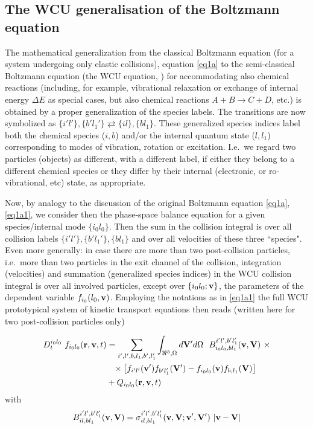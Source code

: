 \subsection{The \acs{WCU} generalisation of the Boltzmann equation}
\label{sec1.01} 

The mathematical generalization from the classical Boltzmann equation (for a
system undergoing only elastic collisions), equation \cref{eq1a} to the
semi-classical Boltzmann equation (the \ac{WCU} equation, \cite{kn:WCU}) for
accommodating also chemical reactions (including, for example, vibrational
relaxation or exchange of internal energy $\Delta E$ as special cases, but also
chemical reactions $A+B \rightarrow C+D$, etc.) is obtained by a proper
generalization of the species labels.
The transitions are now symbolized as $\{i'l'\},\{b'l_1'\} \rightleftarrows
  \{il\},\{bl_1\}$.
These generalized species indices label both the chemical species ($i,b$)
and/or the internal quantum state ($l,l_1$) corresponding to modes of
vibration, rotation or excitation.
I.e.\ we regard two particles (objects) as different, with a different label,
if either they belong to a different chemical species or they differ by their
internal (electronic, or ro-vibrational, etc) state, as appropriate.

Now, by analogy to the discussion of the original Boltzmann equation
\cref{eq1a}, \cref{eq1a1}, we consider then the phase-space balance equation
for a given species/internal mode $\{i_0l_0\}$.
Then the sum in the collision integral is over all collision labels $\{i'l'\},
  \{b'l_1'\}, \{bl_{1}\}$ and over all velocities of these three ``species".
Even more generally:
in case there are more than two post-collision particles, i.e.\ more than two
particles in the exit channel of the collision, integration (velocities) and
summation (generalized species indices) in the \ac{WCU} collision integral is
over all involved particles, except over $\{i_0l_0; \mathbf{v}\}
$, the parameters of the dependent variable $f_{i_0}(l_0,\mathbf{v})$.
Employing the notations as in \cref{eq1a1} the full \ac{WCU} prototypical
system of kinetic transport equations then reads (written here for two
post-collision particles only) 

\begin{align}
  \label{WCU} D_t^{i_0l_0} \ f_{i_0l_0}(\vr,\vvv,t) & =
  \sum_{i',l',b,l_1,b',l_1'}\int_{\Re^3,\Omega}  d\vV'd\Omega \ \
  B_{i_0l_0,bl_1}^{i'l',b'l_1'}(\vvv,\vV) \ \times                       \\
                                                   & \phantom{=} \times
  \left[f_{i'l'}
    (\vvv') f_{b'l_1'}(\vV')- f_{i_0l_0}(\vvv) f_{b,l_1}(\vV)\right] \nonumber
  \\
                                                   & + Q_{i_0l_0}
  (\vr,\vvv,t) \nonumber
\end{align}
with
\begin{equation}
  B_{il,bl_1}^{i'l',b'l_1'}(\vvv,\vV) =
  \sigma_{il,bl_1}^{i'l',b'l_1'}(\vvv,\vV;\vvv',\vV') \ |\vvv-\vV|
\end{equation}

